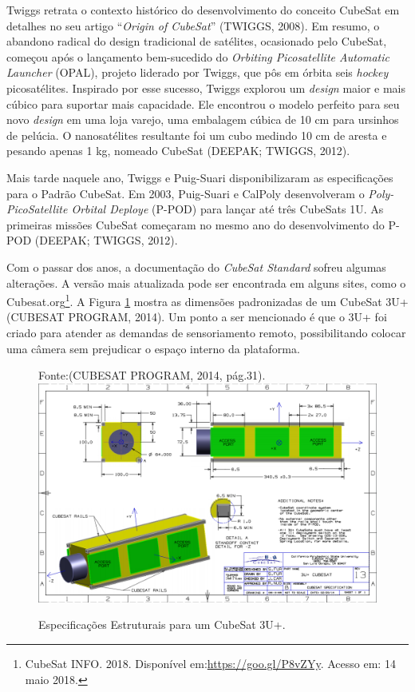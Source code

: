 Twiggs retrata o contexto histórico do desenvolvimento do conceito CubeSat em detalhes no seu artigo “\textit{Origin of CubeSat}” (TWIGGS, 2008). Em resumo, o abandono radical do design tradicional de satélites, ocasionado pelo CubeSat, começou após o lançamento bem-sucedido do \textit{Orbiting Picosatellite Automatic Launcher} (OPAL), projeto liderado por Twiggs, que pôs em órbita seis \textit{hockey} picosatélites. Inspirado por esse sucesso, Twiggs explorou um \textit{design} maior e mais cúbico para suportar mais capacidade. Ele encontrou o modelo perfeito para seu novo \textit{design} em uma loja varejo, uma embalagem cúbica de 10 cm para ursinhos de pelúcia. O nanosatélites resultante foi um cubo medindo 10 cm de aresta e pesando apenas 1 kg, nomeado CubeSat (DEEPAK; TWIGGS, 2012).

Mais tarde naquele ano, Twiggs e Puig-Suari disponibilizaram as especificações para o Padrão CubeSat. Em 2003, Puig-Suari e CalPoly desenvolveram o \textit{Poly-PicoSatellite Orbital Deploye} (P-POD) para lançar até três CubeSats 1U. As primeiras missões CubeSat começaram no  mesmo ano do desenvolvimento do P-POD (DEEPAK; TWIGGS, 2012).

Com o passar dos anos, a documentação do \textit{CubeSat Standard} sofreu algumas alterações. A versão mais atualizada pode ser encontrada em alguns sites, como o Cubesat.org\footnote{CubeSat INFO. 2018. Disponível em:\url{https://goo.gl/P8vZYy}. Acesso em: 14 maio 2018.}. A Figura \ref{fig05} mostra as dimensões padronizadas de um CubeSat 3U+ (CUBESAT PROGRAM, 2014). Um ponto a ser mencionado é que o 3U+ foi criado para atender as demandas de sensoriamento remoto, possibilitando colocar uma câmera sem prejudicar o espaço interno da plataforma.


	\begin{figure}[h]
		\footnotesize{
		\centering
		Fonte:(CUBESAT PROGRAM, 2014, pág.31).
		\includegraphics[keepaspectratio=true,scale=0.55]{figuras/cubesat3u+.PNG}
		\caption{Especificações Estruturais para um CubeSat 3U+.}		
		\label{fig05}
	}
	\end{figure}


